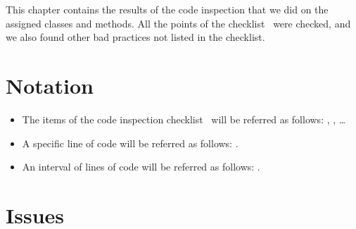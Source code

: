 This chapter contains the results of the code inspection that we did on the assigned classes and methods. All the points of the checklist~\cite{se-assignment} were checked, and we also found other bad practices not listed in the checklist.

\section{Notation}
\begin{itemize}
    \item The items of the code inspection checklist~\cite{se-assignment} will be referred as follows: , , \ldots
    \item A specific line of code will be referred as follows: .
    \item An interval of lines of code will be referred as follows: .
\end{itemize}

\section{Issues}
\label{sec:issues}

